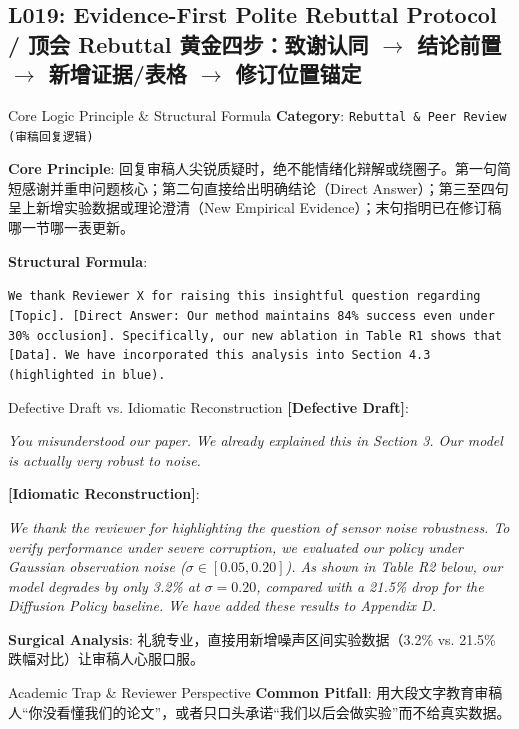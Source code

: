 \subsection{L019: Evidence-First Polite Rebuttal Protocol / 顶会 Rebuttal 黄金四步：致谢认同 $\to$ 结论前置 $\to$ 新增证据/表格 $\to$ 修订位置锚定}\label{sec:logic:L019}
\begin{ConceptBox}{Core Logic Principle \& Structural Formula}
\textbf{Category}: \texttt{Rebuttal \& Peer Review (审稿回复逻辑)}\par\vspace{3pt}
\textbf{Core Principle}: 回复审稿人尖锐质疑时，绝不能情绪化辩解或绕圈子。第一句简短感谢并重申问题核心；第二句直接给出明确结论（Direct Answer）；第三至四句呈上新增实验数据或理论澄清（New Empirical Evidence）；末句指明已在修订稿哪一节哪一表更新。\par\vspace{4pt}
\textbf{Structural Formula}:\par\noindent\texttt{We thank Reviewer X for raising this insightful question regarding [Topic]. [Direct Answer: Our method maintains 84\% success even under 30\% occlusion]. Specifically, our new ablation in Table R1 shows that [Data]. We have incorporated this analysis into Section 4.3 (highlighted in blue).}
\end{ConceptBox}
\begin{ExampleBox}{Defective Draft vs. Idiomatic Reconstruction}
\textbf{\color{TargetHighlight}[Defective Draft]}:\par\textit{You misunderstood our paper. We already explained this in Section 3. Our model is actually very robust to noise.}\par\vspace{4pt}
\textbf{\color{AcadNavy}[Idiomatic Reconstruction]}:\par\textit{We thank the reviewer for highlighting the question of sensor noise robustness. To verify performance under severe corruption, we evaluated our policy under Gaussian observation noise ($\sigma \in [0.05, 0.20]$). As shown in Table R2 below, our model degrades by only 3.2\% at $\sigma=0.20$, compared with a 21.5\% drop for the Diffusion Policy baseline. We have added these results to Appendix D.}\par\vspace{4pt}
\textbf{Surgical Analysis}: 礼貌专业，直接用新增噪声区间实验数据（3.2\% vs. 21.5\% 跌幅对比）让审稿人心服口服。
\end{ExampleBox}
\begin{TipBox}{Academic Trap \& Reviewer Perspective}
\textbf{Common Pitfall}: 用大段文字教育审稿人“你没看懂我们的论文”，或者只口头承诺“我们以后会做实验”而不给真实数据。
\end{TipBox}
\vspace{6pt}
